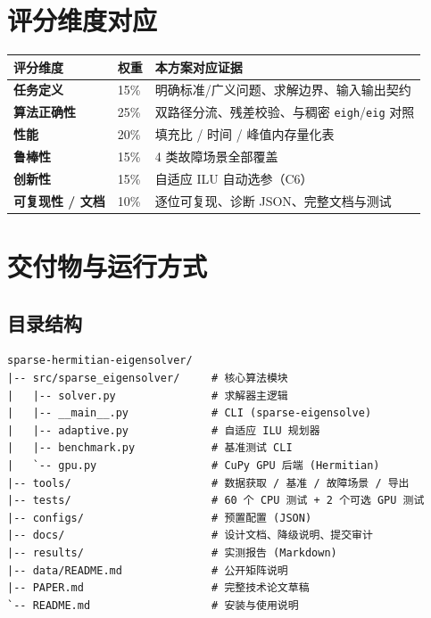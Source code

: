 \documentclass[11pt,a4paper]{ctexart}
\newcommand{\code}[1]{\texttt{\small #1}}
\begin{document}
\section{评分维度对应}

\begin{table}[h]
\centering\small
\renewcommand{\arraystretch}{1.3}
\begin{tabularx}{\textwidth}{@{}>{\bfseries}p{3.2cm} p{1.6cm} X@{}}
\toprule
评分维度 & 权重 & 本方案对应证据 \\
\midrule
任务定义 & 15\% & 明确标准/广义问题、求解边界、输入输出契约 \\
算法正确性 & 25\% & 双路径分流、残差校验、与稠密 \code{eigh}/\code{eig} 对照 \\
性能 & 20\% & 填充比 / 时间 / 峰值内存量化表 \\
鲁棒性 & 15\% & 4 类故障场景全部覆盖 \\
创新性 & 15\% & 自适应 ILU 自动选参（C6） \\
可复现性 / 文档 & 10\% & 逐位可复现、诊断 JSON、完整文档与测试 \\
\bottomrule
\end{tabularx}
\end{table}

\section{交付物与运行方式}

\subsection{目录结构}

\begin{lstlisting}
sparse-hermitian-eigensolver/
|-- src/sparse_eigensolver/     # 核心算法模块
|   |-- solver.py               # 求解器主逻辑
|   |-- __main__.py             # CLI (sparse-eigensolve)
|   |-- adaptive.py             # 自适应 ILU 规划器
|   |-- benchmark.py            # 基准测试 CLI
|   `-- gpu.py                  # CuPy GPU 后端 (Hermitian)
|-- tools/                      # 数据获取 / 基准 / 故障场景 / 导出
|-- tests/                      # 60 个 CPU 测试 + 2 个可选 GPU 测试
|-- configs/                    # 预置配置 (JSON)
|-- docs/                       # 设计文档、降级说明、提交审计
|-- results/                    # 实测报告 (Markdown)
|-- data/README.md              # 公开矩阵说明
|-- PAPER.md                    # 完整技术论文草稿
`-- README.md                   # 安装与使用说明
\end{lstlisting}
\end{document}
